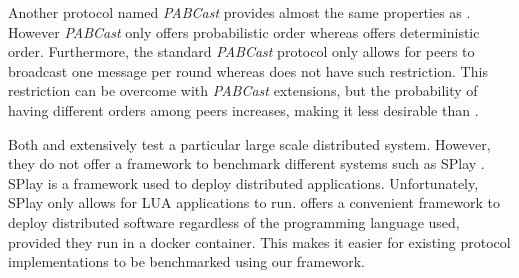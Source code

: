 Another protocol named \textit{PABCast} \autocite{felber2002} provides almost the same properties as \epto. However \textit{PABCast} only offers probabilistic order whereas \epto offers deterministic order. Furthermore, the standard \textit{PABCast} protocol only allows for peers to broadcast one message per round whereas \epto does not have such restriction. This restriction can be overcome with \textit{PABCast} extensions, but the probability of having different orders among peers increases, making it less desirable than \epto.

Both \autocite{Chandra2007} and \autocite{Maia2011} extensively test a particular large scale distributed system. However, they do not offer a framework to benchmark different systems such as SPlay \autocite{Leonini2009}. SPlay is a framework used to deploy distributed applications. Unfortunately, SPlay only allows for LUA applications to run. \eptotester offers a convenient framework to deploy distributed software regardless of the programming language used, provided they run in a docker container. This makes it easier for existing protocol implementations to be benchmarked using our framework.
